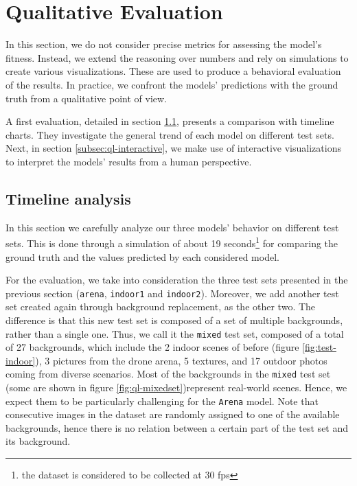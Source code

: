 



\section{Qualitative Evaluation}
\label{sec:evaluation-qualitative}

In this section, we do not consider precise metrics for assessing the model's fitness. Instead, we extend the reasoning over numbers and rely on simulations to create various visualizations. These are used to produce a behavioral evaluation of the results. In practice, we confront the models' predictions with the ground truth from a qualitative point of view.

A first evaluation, detailed in section \ref{subsec:ql-timeline}, presents a comparison with timeline charts. They investigate the general trend of each model on different test sets. Next, in section \ref{subsec:ql-interactive}, we make use of interactive visualizations to interpret the models' results from a human perspective.



\subsection{Timeline analysis}
\label{subsec:ql-timeline}

In this section we carefully analyze our three models' behavior on different test sets. This is done through a simulation of about 19 seconds\footnote{the dataset is considered to be collected at 30 \gls{fps}} for comparing the ground truth and the values predicted by each considered model.

For the evaluation, we take into consideration the three test sets presented in the previous section (\texttt{arena}, \texttt{indoor1} and \texttt{indoor2}). Moreover, we add another test set created again through background replacement, as the other two. The difference is that this new test set is composed of a set of multiple backgrounds, rather than a single one. Thus, we call it the \texttt{mixed} test set, composed of a total of 27 backgrounds, which include the 2 indoor scenes of before (figure \ref{fig:test-indoor}), 3 pictures from the drone arena, 5 textures, and 17 outdoor photos coming from diverse scenarios. Most of the backgrounds in the \texttt{mixed} test set (some are shown in figure \ref{fig:ql-mixedset})represent real-world scenes. Hence, we expect them to be particularly challenging for the \texttt{Arena} model. Note that consecutive images in the dataset are randomly assigned to one of the available backgrounds, hence there is no relation between a certain part of the test set and its background.

